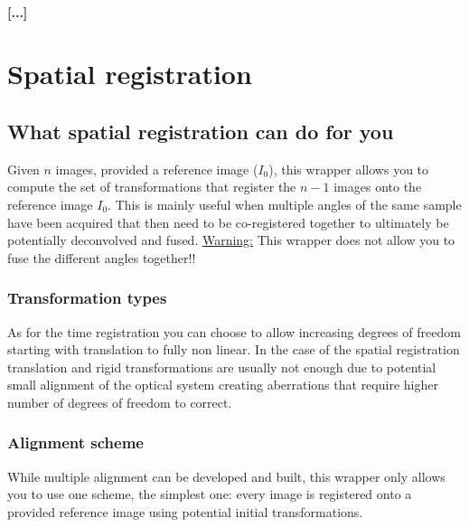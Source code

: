 \documentclass[10pt,a4paper]{book}
\begin{document}
\subsubsection{[...]}
\chapter{Spatial registration}
\section{What spatial registration can do for you}
Given $n$ images, provided a reference image ($I_0$), this wrapper allows you to compute the set of transformations that register the $n-1$ images onto the reference image $I_0$. This is mainly useful when multiple angles of the same sample have been acquired that then need to be co-registered together to ultimately be potentially deconvolved and fused. \underline{Warning:} This wrapper does not allow you to fuse the different angles together!!
\subsection{Transformation types}
As for the time registration you can choose to allow increasing degrees of freedom starting with translation to fully non linear. In the case of the spatial registration translation and rigid transformations are usually not enough due to potential small alignment of the optical system creating aberrations that require higher number of degrees of freedom to correct.
\subsection{Alignment scheme}
While multiple alignment can be developed and built, this wrapper only allows you to use one scheme, the simplest one: every image is registered onto a provided reference image using potential initial transformations.
\end{document}
